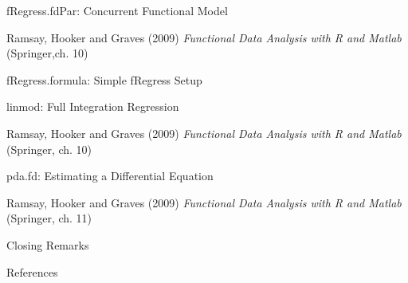 \documentclass[compress]{beamer}
\begin{document}

\begin{frame}{fRegress.fdPar:  Concurrent Functional Model}

Ramsay, Hooker and Graves (2009)
\emph{Functional Data Analysis with R and Matlab}
(Springer,ch. 10)

\end{frame}


\begin{frame}{fRegress.formula:  Simple fRegress Setup}

\end{frame}


\begin{frame}{linmod:  Full Integration Regression}

Ramsay, Hooker and Graves (2009)
\emph{Functional Data Analysis with R and Matlab}
(Springer, ch. 10)

\end{frame}

\begin{frame}{pda.fd:  Estimating a Differential Equation}

Ramsay, Hooker and Graves (2009)
\emph{Functional Data Analysis with R and Matlab}
(Springer, ch. 11)

\end{frame}
\begin{frame}{Closing Remarks}

\end{frame}

\begin{frame}{References}




\end{frame}
\end{document}
